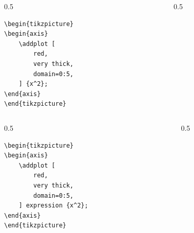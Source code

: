 \documentclass[12pt,aspectratio=169,ignorenonframetext]{ltxbeamer}
\begin{document}
\begin{frame}[fragile]
\begin{columns}
    \begin{column}{0.5\textwidth}
        \begin{verbatim}
\begin{tikzpicture}
\begin{axis}
    \addplot [
        red,
        very thick,
        domain=0:5,
    ] {x^2};
\end{axis}
\end{tikzpicture}
        \end{verbatim}
    \end{column}
    {\color{gray} \vline}
    \begin{column}{0.5\textwidth}
    \end{column}
\end{columns}
\end{frame}





\begin{frame}[fragile]
\begin{columns}
    \begin{column}{0.5\textwidth}
        \begin{verbatim}
\begin{tikzpicture}
\begin{axis}
    \addplot [
        red,
        very thick,
        domain=0:5,
    ] expression {x^2};
\end{axis}
\end{tikzpicture}
        \end{verbatim}
    \end{column}
    {\color{gray} \vline}
    \begin{column}{0.5\textwidth}
    \end{column}
\end{columns}
\end{frame}
\end{document}
